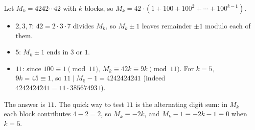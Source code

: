 Let $M_k=4242\cdots42$ with $k$ blocks, so $M_k=42\cdot(1+100+100^2+\cdots+100^{k-1})$.
\begin{itemize}
\item $2,3,7$: $42=2\cdot3\cdot7$ divides $M_k$, so $M_k\pm1$ leaves remainder $\pm1$ modulo each of them.
\item $5$: $M_k\pm1$ ends in $3$ or $1$.
\item $11$: since $100\equiv1\pmod{11}$, $M_k\equiv42k\equiv9k\pmod{11}$. For $k=5$, $9k=45\equiv1$, so $11\mid M_5-1=4242424241$ (indeed $4242424241=11\cdot385674931$).
\end{itemize}
The answer is $\boxed{11}$. The quick way to test $11$ is the alternating digit sum: in $M_k$ each block contributes $4-2=2$, so $M_k\equiv-2k$, and $M_k-1\equiv-2k-1\equiv0$ when $k=5$.
